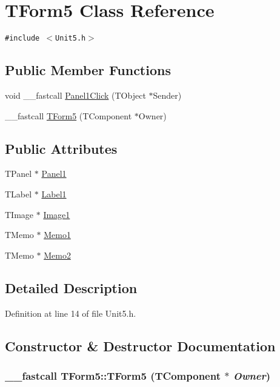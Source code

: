 \hypertarget{classTForm5}{
\section{TForm5 Class Reference}
\label{classTForm5}
}
{\tt \#include $<$Unit5.h$>$}

\subsection*{Public Member Functions}
\begin{CompactItemize}
\item 
void \_\-\_\-fastcall \hyperlink{classTForm5_91989532e25631f0a8580634682c2519}{Panel1Click} (TObject $\ast$Sender)
\item 
\_\-\_\-fastcall \hyperlink{classTForm5_a1d4de0abe25f5b07059021942c81666}{TForm5} (TComponent $\ast$Owner)
\end{CompactItemize}
\subsection*{Public Attributes}
\begin{CompactItemize}
\item 
TPanel $\ast$ \hyperlink{classTForm5_f905ba8b8a01b2e6744406a0735ad9cd}{Panel1}
\item 
TLabel $\ast$ \hyperlink{classTForm5_04f867fff2d21e3d0e6c0bec5fd87fb1}{Label1}
\item 
TImage $\ast$ \hyperlink{classTForm5_bdfd77027c4fd4045308e27b43b8862e}{Image1}
\item 
TMemo $\ast$ \hyperlink{classTForm5_e6f9741559010fe57ae0a98b45dcebab}{Memo1}
\item 
TMemo $\ast$ \hyperlink{classTForm5_5b17387dca79a87f7716ce922e74bce0}{Memo2}
\end{CompactItemize}


\subsection{Detailed Description}


Definition at line 14 of file Unit5.h.

\subsection{Constructor \& Destructor Documentation}
\hypertarget{classTForm5_a1d4de0abe25f5b07059021942c81666}{
\subsubsection[TForm5]{\setlength{\rightskip}{0pt plus 5cm}\_\-\_\-fastcall TForm5::TForm5 (TComponent $\ast$ {\em Owner})}}
\label{classTForm5_a1d4de0abe25f5b07059021942c81666}




